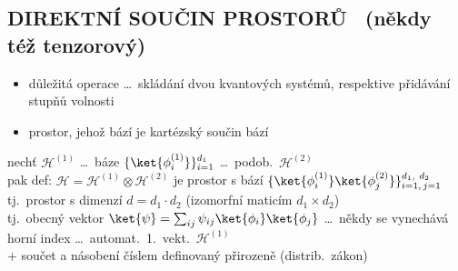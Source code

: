 \documentclass[11pt,a4paper]{article}
\begin{document}
\subsection*{DIREKTNÍ SOUČIN PROSTORŮ \ {\normalfont\small (někdy též tenzorový)}}
\begin{itemize}[nosep]
  \item[--] důležitá operace \dots\ skládání dvou kvantových systémů, respektive přidávání stupňů volnosti
  \item[--] prostor, jehož bází je kartézský součin bází
\end{itemize}

\begin{definice}
nechť $\mathcal{H}^{(1)}$ \dots\ báze $\{\ket{\phi_i^{(1)}}\}_{i=1}^{d_1}$ \quad \dots\ podob.\ $\mathcal{H}^{(2)}$ \\
\quad pak def: \quad $\mathcal{H} = \mathcal{H}^{(1)}\otimes\mathcal{H}^{(2)}$ \quad je prostor s bází $\{\ket{\phi_i^{(1)}}\ket{\phi_j^{(2)}}\}_{i=1,\,j=1}^{d_1,\ d_2}$ \\
\quad tj.\ prostor s dimenzí $d = d_1\cdot d_2$ \quad (izomorfní maticím $d_1\times d_2$) \\
\quad tj.\ obecný vektor \quad $\ket{\psi} = \sum_{ij}\psi_{ij}\ket{\phi_i}\ket{\phi_j}$
\quad \dots\ někdy se vynechává horní index \dots\ automat.\ 1.\ vekt.\ $\mathcal{H}^{(1)}$ \\
\quad + součet a násobení číslem definovaný přirozeně (distrib.\ zákon)
\end{definice}
\end{document}
